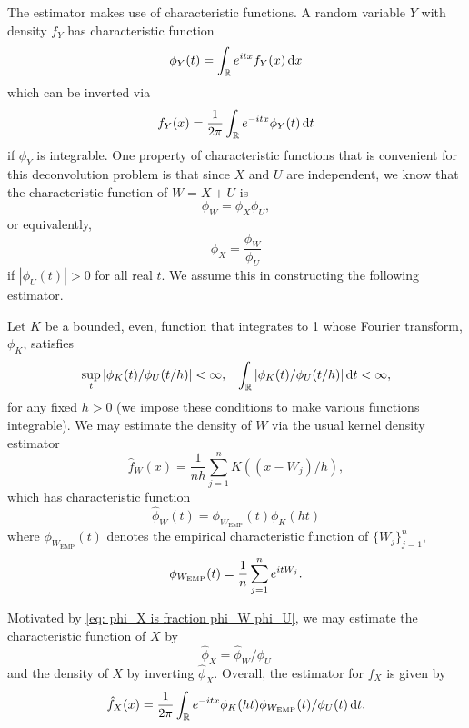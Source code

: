 	The estimator makes use of characteristic functions. A random variable $Y$ with density $f_Y$ has characteristic function
	\begin{equation}
		\phi_Y(t) = \int_\mathbb{R} e^{i t x} f_Y(x) \, \mathrm{d} x
	\end{equation}
	which can be inverted via
	\begin{equation}
		f_Y(x) = \frac{1}{2\pi} \int_\mathbb{R} e^{-itx} \phi_Y(t) \, \mathrm{d} t
	\end{equation}
	if $\phi_Y$ is integrable. One property of characteristic functions that is convenient for this deconvolution problem is that since $X$ and $U$ are independent, we know that the characteristic function of $W = X+ U$ is
	\begin{equation}
		\phi_W = \phi_X \phi_U,
	\end{equation}
	or equivalently,
	\begin{equation}
		\phi_X = \frac{\phi_W}{\phi_U}
		\label{eq: phi_X is fraction phi_W phi_U}
	\end{equation}
	if $|\phi_U(t)| > 0$ for all real $t$. We assume this in constructing the following estimator.

	Let $K$ be a bounded, even, function that integrates to 1 whose Fourier transform, $\phi_K$, satisfies
	\begin{align}
		\sup_t |\phi_K(t) / \phi_U(t / h) | < \infty, &&\int_\mathbb{R} |\phi_K(t) / \phi_U(t / h)| \, \mathrm{d} t < \infty,
	\end{align}
	for any fixed $h > 0$ (we impose these conditions to make various functions integrable). We may estimate the density of $W$ via the usual kernel density estimator
	\begin{equation}
		\hat{f}_W(x) = \frac{1}{n h} \sum_{j = 1}^n K((x - W_j)/h),
	\end{equation}
	which has characteristic function
	\begin{equation}
		\hat{\phi}_W(t) = \phi_{W_\mathrm{EMP}}(t) \phi_K(h t)
	\end{equation}
	where $\phi_{W_\mathrm{EMP}}(t)$ denotes the empirical characteristic function of $\{W_j\}_{j = 1}^n$,
	\begin{equation}
		\phi_{W_\mathrm{EMP}}(t) = \frac{1}{n}\sum_{j = 1}^n e^{itW_j}.
	\end{equation}

	Motivated by \eqref{eq: phi_X is fraction phi_W phi_U}, we may estimate the characteristic function of $X$ by 
	\begin{equation}
		\hat{\phi}_X = \hat{\phi}_W / \phi_U
	\end{equation}
	and the density of $X$ by inverting $\hat{\phi}_X$. Overall, the estimator for $f_X$ is given by
	\begin{equation}
	\label{eq:standard deconvolution estimator}
		\hat{f}_X(x) = \frac{1}{2\pi} \int_\mathbb{R} e^{-itx} \phi_K(ht) \phi_{W_\mathrm{EMP}}(t)  / \phi_U(t) \, \mathrm{d} t.
	\end{equation}

